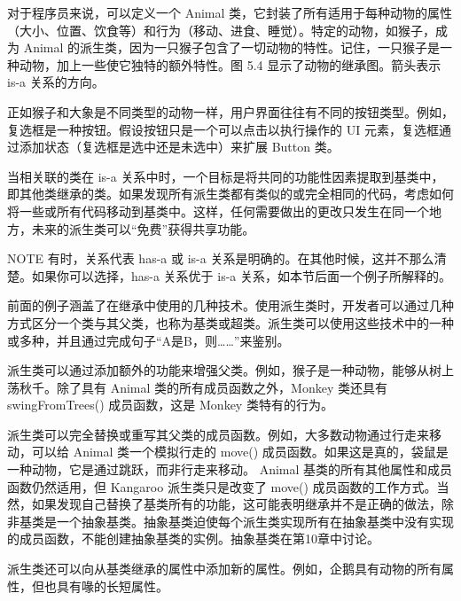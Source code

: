 对于程序员来说，可以定义一个 Animal 类，它封装了所有适用于每种动物的属性（大小、位置、饮食等）和行为（移动、进食、睡觉）。特定的动物，如猴子，成为 Animal 的派生类，因为一只猴子包含了一切动物的特性。记住，一只猴子是一种动物，加上一些使它独特的额外特性。图 5.4 显示了动物的继承图。箭头表示 is-a 关系的方向。


正如猴子和大象是不同类型的动物一样，用户界面往往有不同的按钮类型。例如，复选框是一种按钮。假设按钮只是一个可以点击以执行操作的 UI 元素，复选框通过添加状态（复选框是选中还是未选中）来扩展 Button 类。

当相关联的类在 is-a 关系中时，一个目标是将共同的功能性因素提取到基类中，即其他类继承的类。如果发现所有派生类都有类似的或完全相同的代码，考虑如何将一些或所有代码移动到基类中。这样，任何需要做出的更改只发生在同一个地方，未来的派生类可以“免费”获得共享功能。

\begin{myNotic}{NOTE}
有时，关系代表 has-a 或 is-a 关系是明确的。在其他时候，这并不那么清楚。如果你可以选择，has-a 关系优于 is-a 关系，如本节后面一个例子所解释的。
\end{myNotic}


前面的例子涵盖了在继承中使用的几种技术。使用派生类时，开发者可以通过几种方式区分一个类与其父类，也称为基类或超类。派生类可以使用这些技术中的一种或多种，并且通过完成句子“A是B，则……”来鉴别。


派生类可以通过添加额外的功能来增强父类。例如，猴子是一种动物，能够从树上荡秋千。除了具有 Animal 类的所有成员函数之外，Monkey 类还具有 swingFromTrees() 成员函数，这是 Monkey 类特有的行为。


派生类可以完全替换或重写其父类的成员函数。例如，大多数动物通过行走来移动，可以给 Animal 类一个模拟行走的 move() 成员函数。如果这是真的，袋鼠是一种动物，它是通过跳跃，而非行走来移动。 Animal 基类的所有其他属性和成员函数仍然适用，但 Kangaroo 派生类只是改变了 move() 成员函数的工作方式。当然，如果发现自己替换了基类所有的功能，这可能表明继承并不是正确的做法，除非基类是一个抽象基类。抽象基类迫使每个派生类实现所有在抽象基类中没有实现的成员函数，不能创建抽象基类的实例。抽象基类在第10章中讨论。


派生类还可以向从基类继承的属性中添加新的属性。例如，企鹅具有动物的所有属性，但也具有喙的长短属性。


